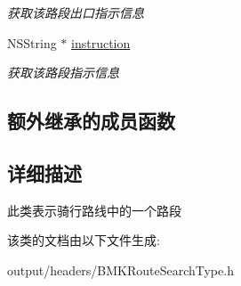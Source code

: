 \begin{DoxyCompactItemize}
\begin{DoxyCompactList}\small\item\em 获取该路段出口指示信息 \end{DoxyCompactList}\item 
\hypertarget{interface_b_m_k_riding_step_ab58c6d9f79e5673b4c252d13bc9dd65a}{}N\+S\+String $\ast$ \hyperlink{interface_b_m_k_riding_step_ab58c6d9f79e5673b4c252d13bc9dd65a}{instruction}\label{interface_b_m_k_riding_step_ab58c6d9f79e5673b4c252d13bc9dd65a}

\begin{DoxyCompactList}\small\item\em 获取该路段指示信息 \end{DoxyCompactList}\end{DoxyCompactItemize}
\subsection*{额外继承的成员函数}


\subsection{详细描述}
此类表示骑行路线中的一个路段 

该类的文档由以下文件生成\+:\begin{DoxyCompactItemize}
\item 
output/headers/B\+M\+K\+Route\+Search\+Type.\+h\end{DoxyCompactItemize}
